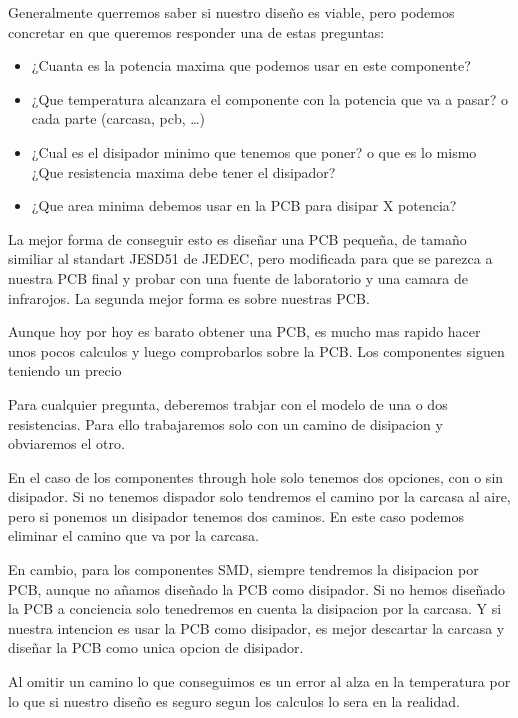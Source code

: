Generalmente querremos saber si nuestro diseño es viable, pero podemos concretar
en que queremos responder una de estas preguntas:
\begin{itemize}
    \item ¿Cuanta es la potencia maxima que podemos usar en este componente?
    \item ¿Que temperatura alcanzara el componente con la potencia que va a pasar?
          o cada parte (carcasa, pcb, \dots)
    \item ¿Cual es el disipador minimo que tenemos que poner? o que es lo mismo
          ¿Que resistencia maxima debe tener el disipador?
    \item ¿Que area minima debemos usar en la PCB para disipar X potencia?
\end{itemize}

La mejor forma de conseguir esto es diseñar una PCB pequeña, de tamaño similiar
al standart JESD51 de JEDEC, pero modificada para que se parezca a nuestra PCB
final y probar con una fuente de laboratorio y una camara de infrarojos. La segunda
mejor forma es sobre nuestras PCB.

Aunque hoy por hoy es barato obtener una PCB, es mucho mas rapido hacer unos pocos
calculos y luego comprobarlos sobre la PCB. Los componentes siguen teniendo un precio

Para cualquier pregunta, deberemos trabjar con el modelo de una o dos resistencias.
Para ello trabajaremos solo con un camino de disipacion y obviaremos el otro.

En el caso de los componentes through hole solo tenemos dos opciones, con o sin
disipador. Si no tenemos dispador solo tendremos el camino por la carcasa al
aire, pero si ponemos un disipador tenemos  dos caminos. En este caso podemos
eliminar el camino que va por la carcasa.

En cambio, para los componentes SMD, siempre tendremos la disipacion por PCB,
aunque no añamos diseñado la PCB como disipador. Si no hemos diseñado la PCB
a conciencia solo
tenedremos en cuenta la disipacion por la carcasa. Y si nuestra intencion es
usar la PCB como disipador, es mejor descartar la carcasa y diseñar la PCB
como unica opcion de disipador.

Al omitir un camino lo que conseguimos es un error al alza en la temperatura
por lo que si nuestro diseño es seguro
segun los calculos lo sera en la realidad.

